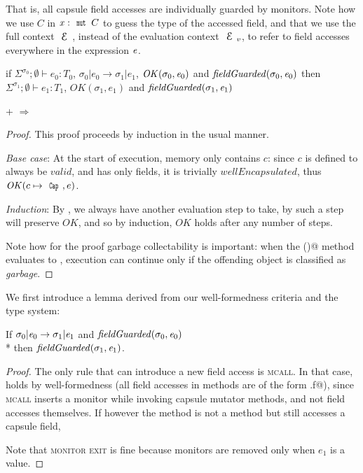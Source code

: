That is, all \Q@mut@ capsule field accesses are individually guarded by monitors.
Note how we use $C$ in $\x:\Kw{mut}\,C$ to guess the type of the accessed field,
and that we use the full context $\ctx$, instead of the evaluation context $\ctx_v$,
to refer to field accesses everywhere in the expression ${\mathit{e}}$.


\begin{theorem}\rm
if $\Sigma^{\sigma_0};\emptyset\vdash e_0: T_0$,
$\sigma_0|e_0\rightarrow \sigma_1|e_1$,
$\mathit{OK}(\sigma_0,{\mathit{e}}_0)$
and
$\mathit{fieldGuarded}(\sigma_0,{\mathit{e}}_0)$
then
$\Sigma^{\sigma_1};\emptyset\vdash e_1: T_1$,
$\mathit{OK}(\sigma_1,e_1)$ and
$\mathit{fieldGuarded}(\sigma_1,{\mathit{e}}_1)$
\end{theorem}

\begin{theorem}\rm
	 +  $\Rightarrow$ 
\end{theorem}
\begin{proof}
This proof proceeds by induction in the usual manner.

\emph{Base case}: At the start of execution, memory only contains $c$: since $c$ is defined to always be $\mathit{valid}$, and has only \Q@mut@ fields, it is trivially $\mathit{wellEncapsulated}$, thus $\mathit{OK}(c\mapsto\Kw{Cap},e)$.

\emph{Induction}: By , we always have another evaluation step to take, by  such a step will preserve $\mathit{OK}$, and so by induction, $\mathit{OK}$ holds after any number of steps.

Note how for the proof garbage collectability is important:
when the \Q@invariant()@ method evaluates to \Q@false@,
execution can continue only if the offending object is classified as \emph{garbage}.
\end{proof}

We first introduce a lemma derived from our well-formedness criteria and the type system:
\begin{Lemma}\rm
If $\sigma_0 | {\mathit{e}}_0\rightarrow \sigma_1 |{\mathit{e}}_1$ and
$\mathit{fieldGuarded}(\sigma_0,{\mathit{e}}_0)$
\\*
then $\mathit{fieldGuarded}(\sigma_1,{\mathit{e}}_1)$.
\end{Lemma}
\begin{proof}
The only rule that can
introduce a new field access is \textsc{mcall}.
In that case,  holds
by well-formedness (all field accesses in methods are of the form \Q@this.f@),
since \textsc{mcall} inserts a monitor while invoking capsule mutator methods, and not field accesses themselves. If however the method is not a \Q@mut@ method but still accesses a capsule field, 

Note that \textsc{monitor exit} is fine because monitors are removed only when
 $e_1$ is a value.
\end{proof}

